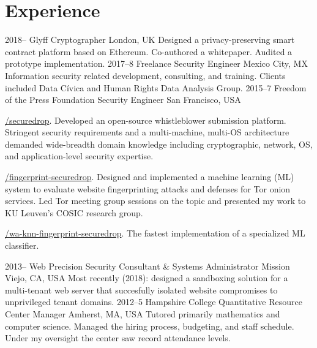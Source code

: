 \documentclass[]{fowlslegs-cv}
\newcommand\makeIcon[1]{%
    \raisebox{-1pt}{%
        \texttt{[image: icons/\#1]}%
    }%
}
\begin{document}
\section{Experience}
\begin{entrylist}
\entry
{2018--}
{Glyff}
{Cryptographer}
{London, UK}
{Designed a privacy-preserving smart contract platform based on Ethereum.
Co-authored a whitepaper. Audited a prototype implementation.}
\entry
{2017--8}
{Freelance}
{Security Engineer}
{Mexico City, MX}
{Information security related development, consulting, and training. Clients
included Data Cívica and Human Rights Data Analysis Group.}
\entry
{2015--7}
{Freedom of the Press Foundation}
{Security Engineer}
{San Francisco, USA}
{\makeIcon{github}
  \href{https://github.com/freedomofpress/securedrop}{/securedrop}. Developed
  an open-source whistleblower submission platform. Stringent security
  requirements and a multi-machine, multi-OS architecture demanded
  wide-breadth domain knowledge including cryptographic, network, OS, and
  application-level security expertise. \\
  \makeIcon{github}
  \href{https://github.com/freedomofpress/fingerprint-securedrop}{/fingerprint-securedrop}.
  Designed and implemented a machine learning (ML) system to evaluate website
  fingerprinting attacks and defenses for Tor onion services. Led Tor meeting
  group sessions on the topic and presented my work to KU Leuven's COSIC
  research group. \\
  \makeIcon{github}
  \href{https://github.com/freedomofpress/wa-knn-fingerprint-securedrop}{/wa-knn-fingerprint-securedrop}.
  The fastest implementation of a specialized ML classifier.}
\entry
{2013--}
{Web Precision}
{Security Consultant \& Systems Administrator}
{Mission Viejo, CA, USA}
{Most recently (2018): designed a sandboxing solution for a multi-tenant web
server that succesfully isolated website compromises to unprivileged tenant domains.}
\entry
{2012--5}
{Hampshire College Quantitative Resource Center}
{Manager}
{Amherst, MA, USA}
{Tutored primarily mathematics and computer science. Managed the hiring process,
budgeting, and staff schedule. Under my oversight the center saw record
attendance levels.}
\end{entrylist}
\end{document}
